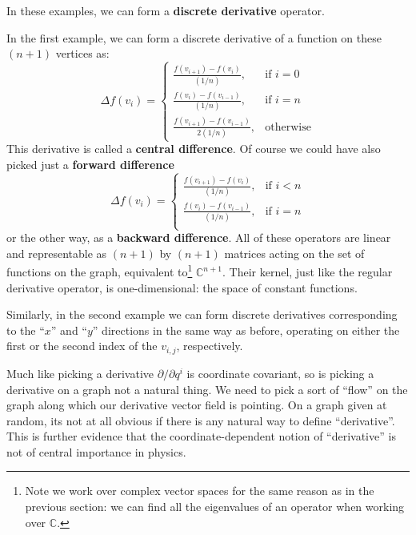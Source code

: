 \documentclass[../master.tex]{subfiles}
\begin{document}
	In these examples, we can form a \textbf{discrete derivative} operator. 
	\begin{example}
		In the first example, we can form a discrete derivative of a function on these $(n+1)$ vertices as:
		\begin{equation}
			\Delta f(v_i) = \begin{cases}
				\frac{f(v_{i+1}) - f(v_{i})}{(1/n)}, & \text{if } \textit{$i = 0$}\\
				\frac{f(v_{i}) - f(v_{i-1})}{(1/n)}, & \text{if } \textit{$i = n$}\\
				\frac{f(v_{i+1}) - f(v_{i-1})}{2 (1/n)}, & \text{otherwise}
			\end{cases}
		\end{equation}
		This derivative is called a \textbf{central difference}. Of course we could have also picked just a \textbf{forward difference}
		\begin{equation}
			\Delta f(v_i) = \begin{cases}
				\frac{f(v_{i+1}) - f(v_{i})}{(1/n)}, & \text{if } \textit{$i < n$}\\
				\frac{f(v_{i}) - f(v_{i-1})}{(1/n)}, & \text{if } \textit{$i = n$}\\
			\end{cases}
		\end{equation}
		or the other way, as a \textbf{backward difference}. All of these operators are linear and representable as $(n+1)$ by $(n+1)$ matrices acting on the set of functions on the graph, equivalent to\footnote{Note we work over complex vector spaces for the same reason as in the previous section: we can find all the eigenvalues of an operator when working over $\mathbb C$.} $\mathbb C^{n+1}$. Their kernel, just like the regular derivative operator, is one-dimensional: the space of constant functions. 
		
		Similarly, in the second example we can form discrete derivatives corresponding to the ``$x$'' and ``$y$'' directions in the same way as before, operating on either the first or the second index of the $v_{i,j}$, respectively. 
	\end{example}
	
	Much like picking a derivative $\partial/\partial q^i$ is coordinate covariant, so is picking a derivative on a graph not a natural thing. We need to pick a sort of ``flow'' on the graph along which our derivative vector field is pointing. On a graph given at random, its not at all obvious if there is any natural way to define ``derivative''. This is further evidence that the coordinate-dependent notion of ``derivative'' is not of central importance in physics. 
	
\end{document}
